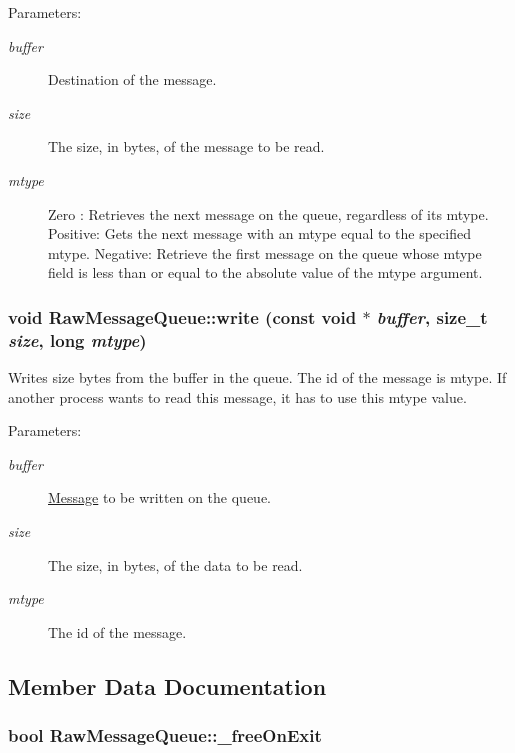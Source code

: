 \begin{Desc}
\item[Parameters:]
\begin{description}
\item[{\em buffer}]Destination of the message. \item[{\em size}]The size, in bytes, of the message to be read. \item[{\em mtype}]Zero : Retrieves the next message on the queue, regardless of its mtype. Positive: Gets the next message with an mtype equal to the specified mtype. Negative: Retrieve the first message on the queue whose mtype field is less than or equal to the absolute value of the mtype argument. \end{description}
\end{Desc}
\hypertarget{classRawMessageQueue_7fda81eaf94a970e82241d6efa2562d5}{
\subsubsection[{write}]{\setlength{\rightskip}{0pt plus 5cm}void RawMessageQueue::write (const void $\ast$ {\em buffer}, \/  size\_\-t {\em size}, \/  long {\em mtype})}}
\label{classRawMessageQueue_7fda81eaf94a970e82241d6efa2562d5}


Writes size bytes from the buffer in the queue. The id of the message is mtype. If another process wants to read this message, it has to use this mtype value.

\begin{Desc}
\item[Parameters:]
\begin{description}
\item[{\em buffer}]\hyperlink{classMessage}{Message} to be written on the queue. \item[{\em size}]The size, in bytes, of the data to be read. \item[{\em mtype}]The id of the message. \end{description}
\end{Desc}


\subsection{Member Data Documentation}
\hypertarget{classRawMessageQueue_2dc13c3e504b33527dbea9ceb06d640c}{
\subsubsection[{\_\-freeOnExit}]{\setlength{\rightskip}{0pt plus 5cm}bool {\bf RawMessageQueue::\_\-freeOnExit}}}
\label{classRawMessageQueue_2dc13c3e504b33527dbea9ceb06d640c}


